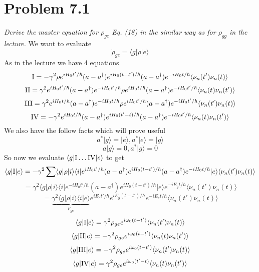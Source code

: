 \documentclass[12pt]{article}
\newcommand{\RomanNumeralCaps}[1]
    {\MakeUppercase{\romannumeral #1}}
\newcommand{\ket}[1]{\vert{#1}\rangle}
\begin{document}
\section{Problem 7.1}
\emph{Derive the master equation for $\rho_{ge}$ Eq. (18) in the similar way as for $\rho_{gg}$ in the lecture.}
We want to evaluate 
$$ \dot{\rho}_{ge} = \langle g | \dot{\rho} | e \rangle $$
As in the lecture we have 4 equations 
$$ \text{\RomanNumeralCaps{1}}=  - \gamma^2 \rho e^{iH_0 t'/\hbar } (a - a^{\dagger}) e^{i H_0 (t-t')/\hbar } (a-a^{\dagger}) e^{-i H_0 t/\hbar } \langle \nu_n (t') \nu_n (t) \rangle $$
$$ \text{\RomanNumeralCaps{2}}= \gamma^2 e^{i H_0 t'/ \hbar } (a-a^{\dagger}) e^{-iH_0 t'/\hbar } \rho e^{i H_0 t/ \hbar } (a-a^{\dagger} ) e^{-i H_0 t' / \hbar } \langle \nu_n (t) \nu_n (t') \rangle $$
$$ \text{\RomanNumeralCaps{3}}= \gamma^2 e^{i H_0 t/ \hbar} (a-a^{\dagger}) e^{-i H_0 t / \hbar} \rho e^{i H_0 t' / \hbar } )a-a^{\dagger}) e^{-i H_0 t' / \hbar } \langle \nu_n (t') \nu_n (t) \rangle $$
$$ \text{\RomanNumeralCaps{4}}= - \gamma^2 e^{i H_0 t/ \hbar} (a-a^{\dagger}) e^{i H_0 (t'-t) / \hbar} (a-a^{\dagger}) e^{-i H_0 t' / \hbar} \langle \nu_n (t) \nu_n (t') \rangle $$
We also have the follow facts which will prove useful 
$$ a^* \ket{g} = \ket{e}, a^* \ket{e} = \ket{g} $$
$$ a \ket{g} = 0, a^* \ket{g} = 0 $$
So now we evaluate $ \langle g | \text{\RomanNumeralCaps{1}} \ldots \text{\RomanNumeralCaps{4}} | e \rangle$ to get 
$$ \langle g | \text{\RomanNumeralCaps{1}} | e \rangle =  - \gamma^2 \sum \langle g | \rho | i \rangle \langle i | e^{i H_0 t'/ \hbar} (a-a^{\dagger}) e^{i H_0 (t-t') / \hbar} (a-a^{\dagger})e^{-i H_0 t / \hbar} \ket{e} \langle \nu_n (t') \nu_n (t) \rangle $$
$$ = \gamma^2 \langle g | \rho | i \rangle \langle i | e^{-i H_0 t' / \hbar } (a-a^{\dagger} ) e^{i H_0 (t-t') / \hbar} \ket{e} e^{-i E_g t/ \hbar } \langle \nu_n (t') \nu_n (t) \rangle $$
$$ = \underbrace{\gamma^2 \langle g | \rho | i \rangle \langle i | e \rangle}_{\rho_{ge}} e^{i E_e t' / \hbar} e^{i E_g (t-t') / \hbar} e^{-i E_e t/ \hbar} \langle \nu_n (t') \nu_n (t) \rangle $$
$$ \langle g | \text{\RomanNumeralCaps{1}} | e \rangle = \gamma^2 \rho_{ge} e^{i \omega_0 (t-t') } \langle \nu_n (t') \nu_n (t) \rangle $$
$$ \langle g | \text{\RomanNumeralCaps{2}} | e \rangle = - \gamma^2 \rho_{ge} e^{i \omega_0 (t-t')} \langle \nu_n (t) \nu_n (t') \rangle $$
$$\langle g | \text{\RomanNumeralCaps{3}} | e \rangle = - \gamma^2 \rho_{ge} e^{i \omega_0 (t-t') } \langle \nu_n (t') \nu_n (t) \rangle $$
$$ \langle g | \text{\RomanNumeralCaps{4}} | e \rangle = \gamma^2 \rho_{ge} e^{i \omega_0 (t'-t) } \langle \nu_n (t) \nu_n (t') \rangle $$
\end{document}
